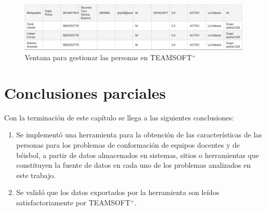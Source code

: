 \begin{figure}[H]
	\centering
	\includegraphics[width=1\textwidth]{figuras/exportarPersonasTeamsoft.png}
	\caption{Ventana para gestionar las personas en TEAMSOFT$^+$}\label{fig:exportar-personas}
\end{figure}

\section{Conclusiones parciales}
Con la terminación de este capítulo se llega a las siguientes conclusiones:
\begin{enumerate}
	\item Se implementó una herramienta para la obtención de las características de las personas para los problemas de conformación de equipos docentes y de béisbol, a partir de datos almacenados en sistemas, sitios o herramientas que constituyen la fuente de datos en cada uno de los problemas analizados en este trabajo.
	\item Se validó que los datos exportados por la herramienta son leídos satisfactoriamente por TEAMSOFT$^+$.
\end{enumerate}
